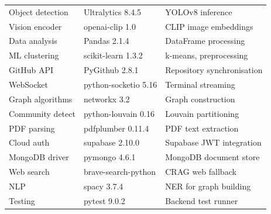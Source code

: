 \begin{table}[ht]
\begin{tabular}{lll}
        Object detection    & Ultralytics 8.4.5     & YOLOv8 inference \\
        Vision encoder      & openai-clip 1.0       & CLIP image embeddings \\
        Data analysis       & Pandas 2.1.4          & DataFrame processing \\
        ML clustering       & scikit-learn 1.3.2    & k-means, preprocessing \\
        GitHub API          & PyGithub 2.8.1        & Repository synchronisation \\
        WebSocket           & python-socketio 5.16  & Terminal streaming \\
        Graph algorithms    & networkx 3.2          & Graph construction \\
        Community detect    & python-louvain 0.16   & Louvain partitioning \\
        PDF parsing         & pdfplumber 0.11.4     & PDF text extraction \\
        Cloud auth          & supabase 2.10.0       & Supabase JWT integration \\
        MongoDB driver      & pymongo 4.6.1         & MongoDB document store \\
        Web search          & brave-search-python   & CRAG web fallback \\
        NLP                 & spacy 3.7.4           & NER for graph building \\
        Testing             & pytest 9.0.2          & Backend test runner \\
        \bottomrule
    \end{tabular}
\end{table}

